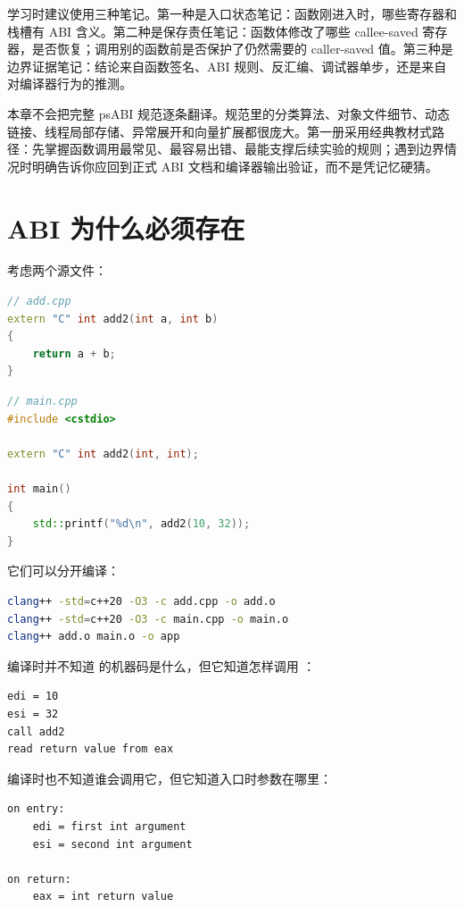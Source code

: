 学习时建议使用三种笔记。第一种是入口状态笔记：函数刚进入时，哪些寄存器和栈槽有 ABI 含义。第二种是保存责任笔记：函数体修改了哪些 callee-saved 寄存器，是否恢复；调用别的函数前是否保护了仍然需要的 caller-saved 值。第三种是边界证据笔记：结论来自函数签名、ABI 规则、反汇编、调试器单步，还是来自对编译器行为的推测。

本章不会把完整 psABI 规范逐条翻译。规范里的分类算法、对象文件细节、动态链接、线程局部存储、异常展开和向量扩展都很庞大。第一册采用经典教材式路径：先掌握函数调用最常见、最容易出错、最能支撑后续实验的规则；遇到边界情况时明确告诉你应回到正式 ABI 文档和编译器输出验证，而不是凭记忆硬猜。

\section{ABI 为什么必须存在}

考虑两个源文件：

\begin{lstlisting}[language=C++]
// add.cpp
extern "C" int add2(int a, int b)
{
    return a + b;
}
\end{lstlisting}

\begin{lstlisting}[language=C++]
// main.cpp
#include <cstdio>

extern "C" int add2(int, int);

int main()
{
    std::printf("%d\n", add2(10, 32));
}
\end{lstlisting}

它们可以分开编译：

\begin{lstlisting}[language=bash]
clang++ -std=c++20 -O3 -c add.cpp -o add.o
clang++ -std=c++20 -O3 -c main.cpp -o main.o
clang++ add.o main.o -o app
\end{lstlisting}

 编译时并不知道  的机器码是什么，但它知道怎样调用 ：

\begin{lstlisting}
edi = 10
esi = 32
call add2
read return value from eax
\end{lstlisting}

 编译时也不知道谁会调用它，但它知道入口时参数在哪里：

\begin{lstlisting}
on entry:
    edi = first int argument
    esi = second int argument

on return:
    eax = int return value
\end{lstlisting}

